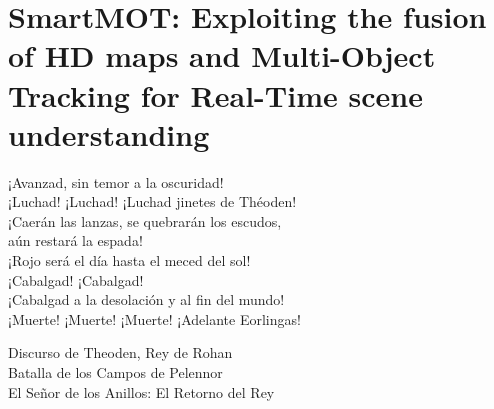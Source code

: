 % 
% 
% 
% 
% 
% 
% 

\chapter{SmartMOT: Exploiting the fusion of HD maps and Multi-Object Tracking for Real-Time scene understanding}
\label{cha:smartmot_exploiting_the_fusion_of_hdmaps_and_mot}

\begin{FraseCelebre}
	\begin{Frase}
		¡Avanzad, sin temor a la oscuridad! \\
		¡Luchad! ¡Luchad! ¡Luchad jinetes de Théoden! \\
		¡Caerán las lanzas, se quebrarán los escudos,  \\
		aún restará la espada! \\
		¡Rojo será el día hasta el meced del sol! \\
		¡Cabalgad! ¡Cabalgad! \\
		¡Cabalgad a la desolación y al fin del mundo! \\
		¡Muerte! ¡Muerte! ¡Muerte! ¡Adelante Eorlingas!
	\end{Frase}
	\begin{Fuente}
		Discurso de Theoden, Rey de Rohan \\
		Batalla de los Campos de Pelennor \\
		El Señor de los Anillos: El Retorno del Rey
	\end{Fuente}
\end{FraseCelebre}

